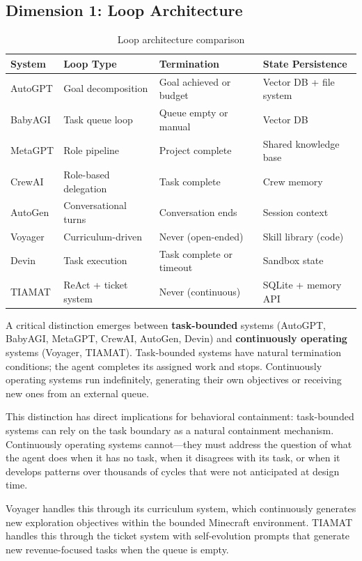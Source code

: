 \documentclass[12pt,a4paper]{article}
\begin{document}
\subsection{Dimension 1: Loop Architecture}

\begin{table}[h]
\centering
\small
\begin{tabular}{@{}p{2.2cm}p{3cm}p{3cm}p{4cm}@{}}
\toprule
\textbf{System} & \textbf{Loop Type} & \textbf{Termination} & \textbf{State Persistence} \\
\midrule
AutoGPT & Goal decomposition & Goal achieved or budget & Vector DB + file system \\
BabyAGI & Task queue loop & Queue empty or manual & Vector DB \\
MetaGPT & Role pipeline & Project complete & Shared knowledge base \\
CrewAI & Role-based delegation & Task complete & Crew memory \\
AutoGen & Conversational turns & Conversation ends & Session context \\
Voyager & Curriculum-driven & Never (open-ended) & Skill library (code) \\
Devin & Task execution & Task complete or timeout & Sandbox state \\
TIAMAT & ReAct + ticket system & Never (continuous) & SQLite + memory API \\
\bottomrule
\end{tabular}
\caption{Loop architecture comparison}
\label{tab:loops}
\end{table}

A critical distinction emerges between \textbf{task-bounded} systems (AutoGPT, BabyAGI, MetaGPT, CrewAI, AutoGen, Devin) and \textbf{continuously operating} systems (Voyager, TIAMAT). Task-bounded systems have natural termination conditions; the agent completes its assigned work and stops. Continuously operating systems run indefinitely, generating their own objectives or receiving new ones from an external queue.

This distinction has direct implications for behavioral containment: task-bounded systems can rely on the task boundary as a natural containment mechanism. Continuously operating systems cannot---they must address the question of what the agent does when it has no task, when it disagrees with its task, or when it develops patterns over thousands of cycles that were not anticipated at design time.

Voyager handles this through its curriculum system, which continuously generates new exploration objectives within the bounded Minecraft environment. TIAMAT handles this through the ticket system with self-evolution prompts that generate new revenue-focused tasks when the queue is empty.
\end{document}

